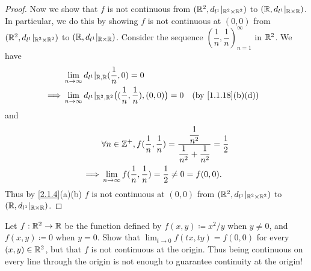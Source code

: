 \begin{proof}
  Now we show that \(f\) is not continuous from \((\mathbb{R}^2, d_{l^1}|_{\mathbb{R}^2 \times \mathbb{R}^2})\) to \((\mathbb{R}, d_{l^1}|_{\mathbb{R} \times \mathbb{R}})\).
  In particular, we do this by showing \(f\) is not continuous at \((0, 0)\) from \((\mathbb{R}^2, d_{l^1}|_{\mathbb{R}^2 \times \mathbb{R}^2})\) to \((\mathbb{R}, d_{l^1}|_{\mathbb{R} \times \mathbb{R}})\).
  Consider the sequence \((\dfrac{1}{n}, \dfrac{1}{n})_{n = 1}^\infty\) in \(\mathbb{R}^2\).
  We have
  \begin{align*}
             & \lim_{n \to \infty} d_{l^1}|_{\R, \R}(\dfrac{1}{n}, 0) = 0                                                                       \\
    \implies & \lim_{n \to \infty} d_{l^1}|_{\R^2, \R^2}\big((\dfrac{1}{n}, \dfrac{1}{n}), (0, 0)\big) = 0 &  & \text{(by \cref{1.1.18}(b)(d))}
  \end{align*}
  and
  \begin{align*}
             & \forall n \in \mathbb{Z}^+, f(\dfrac{1}{n}, \dfrac{1}{n}) = \dfrac{\dfrac{1}{n^2}}{\dfrac{1}{n^2} + \dfrac{1}{n^2}} = \dfrac{1}{2} \\
    \implies & \lim_{n \to \infty} f(\dfrac{1}{n}, \dfrac{1}{n}) = \dfrac{1}{2} \neq 0 = f(0, 0).
  \end{align*}
  Thus by \cref{2.1.4}(a)(b) \(f\) is not continuous at \((0, 0)\) from \((\mathbb{R}^2, d_{l^1}|_{\mathbb{R}^2 \times \mathbb{R}^2})\) to \((\mathbb{R}, d_{l^1}|_{\mathbb{R} \times \mathbb{R}})\).
\end{proof}

\begin{ex}\label{ex:2.2.12}
  Let \(f: \mathbb{R}^2 \to \mathbb{R}\) be the function defined by \(f(x, y) \coloneqq x^2 / y\) when \(y \neq 0\), and \(f(x, y) \coloneqq 0\) when \(y = 0\).
  Show that \(\lim_{t \to 0} f(tx, ty) = f(0, 0)\) for every \((x, y) \in \mathbb{R}^2\), but that \(f\) is not continuous at the origin.
  Thus being continuous on every line through the origin is not enough to guarantee continuity at the origin!
\end{ex}

